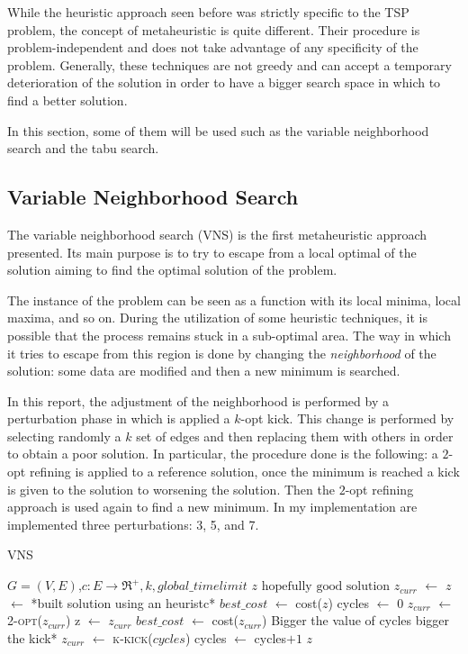 While the heuristic approach seen before was strictly specific to the TSP problem, the concept of metaheuristic is quite different. Their procedure is problem-independent and does not take advantage of any specificity of the problem. Generally, these techniques are not greedy and can accept a temporary deterioration of the solution in order to have a bigger search space in which to find a better solution.

In this section, some of them will be used such as the variable neighborhood search and the tabu search.

\subsection{Variable Neighborhood Search}
\label{sec:VNS}
The variable neighborhood search (VNS) is the first metaheuristic approach presented. Its main purpose is to try to escape from a local optimal of the solution aiming to find the optimal solution of the problem. 

The instance of the problem can be seen as a function with its local minima, local maxima, and so on. During the utilization of some heuristic techniques, it is possible that the process remains stuck in a sub-optimal area. The way in which it tries to escape from this region is done by changing the \textit{neighborhood} of the solution: some data are modified and then a new minimum is searched.

In this report, the adjustment of the neighborhood is performed by a perturbation phase in which is applied a $k$-opt kick. This change is performed by selecting randomly a $k$ set of edges and then replacing them with others in order to obtain a poor solution. In particular, the procedure done is the following: a $2$-opt refining is applied to a reference solution, once the minimum is reached a kick is given to the solution to worsening the solution. Then the $2$-opt refining approach is used again to find a new minimum. In my implementation are implemented three perturbations: 3, 5, and 7.

\begin{algorithm}
	\caption{VNS}\label{algo:vns}
	\begin{algorithmic}[1]
		\Require $G=(V,E)$,$ c:E\rightarrow \Re^+, k, global\_timelimit$
		\Ensure $z\text{ hopefully good solution}$
		\State $z_{curr}$ $\gets$ $z$ $\gets$ *built solution using an heuristc*
		\State $best\_cost$ $\gets$ cost($z$)
		\State cycles $\gets$ $0$
			\State $z_{curr}$ $\gets$ \textsc{2-opt($z_{curr}$)}
				\State z $\gets$ $z_{curr}$
				\State $best\_cost$ $\gets$ cost($z_{curr}$)
			\EndIf
		\State *Bigger the value of cycles bigger the kick*
		\State $z_{curr}$ $\gets$ \textsc{k-kick($cycles$)}
		\State cycles $\gets$ cycles$+1$
		\EndWhile
		\State \Return $z$
	\end{algorithmic}
\end{algorithm}


